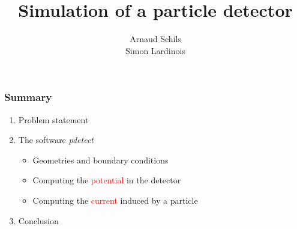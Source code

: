 \documentclass[14pt]{beamer}
\begin{document}
  {
\begin{frame}

\title{Simulation of a particle detector}
\author{Arnaud Schils \\ Simon Lardinois}
\maketitle

\end{frame}
}

\begin{frame}
\frametitle{Summary}

\begin{enumerate}
  \setlength\itemsep{1.4em}
  \item Problem statement
  \item The software \textit{pdetect}
  \begin{itemize}
    \item Geometries and boundary conditions
    \item Computing the \textcolor{red}{potential} in the detector
    \item Computing the \textcolor{red}{current} induced by a particle
  \end{itemize}
  \item Conclusion
\end{enumerate}
\end{frame}
\end{document}
